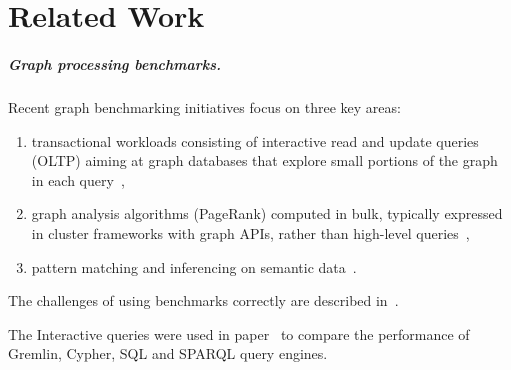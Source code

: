 \chapter{Related Work}
\label{sec:related-work}


\paragraph*{Graph processing benchmarks.}

Recent graph benchmarking initiatives focus on three key areas:

\begin{enumerate}
\item transactional workloads consisting of interactive read and update queries (OLTP) aiming at graph databases that explore small portions of the graph in each query~\cite{DBLP:conf/cidr/BarahmandG13,DBLP:conf/sigmod/ArmstrongPBC13,DBLP:journals/ase/DayarathnaS14,DBLP:conf/sigmod/ErlingALCGPPB15,DBLP:journals/pvldb/LissandriniBV18},
\item graph analysis algorithms (\eg PageRank) computed in bulk, typically expressed in cluster frameworks with graph APIs, rather than high-level queries~\cite{DBLP:conf/hipc/BaderM05,DBLP:conf/bigdataconf/ElserM13,DBLP:conf/sc/NaiXTKL15,DBLP:journals/pvldb/IosupHNHPMCCSAT16},
\item pattern matching and inferencing on semantic data~\cite{DBLP:journals/ws/GuoPH05,DBLP:books/sp/virgilio09/SchmidtHMPL09,DBLP:conf/semweb/MorseyLAN11,DBLP:conf/semweb/AlucHOD14,DBLP:journals/sosym/SzarnyasIRV18}.
\end{enumerate}

The challenges of using benchmarks correctly are described in~\cite{DBLP:conf/sigmod/RaasveldtHGM18}.

The Interactive queries were used in paper~\cite{DBLP:conf/grades/PacaciZLO17} to compare the performance of Gremlin, Cypher, SQL and SPARQL query engines.


